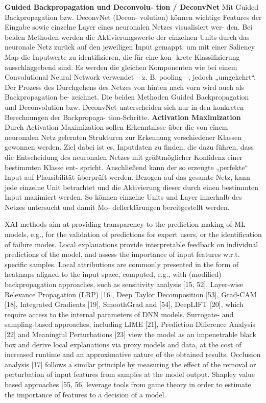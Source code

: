 \documentclass[11pt,a4paper]{article}
\numberwithin{equation}{section}
\begin{document}
	
	\noindent \textbf{Guided Backpropagation und Deconvolu-
		tion / DeconvNet}
	Mit Guided Backpropagation bzw. DeconvNet (Decon-
	volution) können wichtige Features der Eingabe sowie
	einzelne Layer eines neuronalen Netzes visualisiert wer-
	den. Bei beiden Methoden werden die Aktivierungswerte
	der einzelnen Units durch das neuronale Netz zurück
	auf den jeweiligen Input gemappt, um mit einer Saliency
	Map die Inputwerte zu identifizieren, die für eine kon-
	krete Klassifizierung ausschlaggebend sind. Es werden
	die gleichen Komponenten wie bei einem Convolutional
	Neural Network verwendet – z. B. pooling –, jedoch
	„umgekehrt“. Der Prozess des Durchgehens des Netzes
	von hinten nach vorn wird auch als Backpropagation be-
	zeichnet. Die beiden Methoden Guided Backpropagation
	und Deconvolution bzw. DeconvNet unterscheiden sich
	nur in den konkreten Berechnungen der Backpropaga-
	tion-Schritte.
	\noindent \textbf{Activation Maximization}
	Durch Activation Maximization sollen Erkenntnisse über
	die von einem neuronalen Netz gelernten Strukturen zur
	Erkennung verschiedener Klassen gewonnen werden.
	Ziel dabei ist es, Inputdaten zu finden, die dazu führen,
	dass die Entscheidung des neuronalen Netzes mit
	größtmöglicher Konfidenz einer bestimmten Klasse ent-
	spricht. Anschließend kann der so erzeugte „perfekte“
	Input auf Plausibilität überprüft werden. Bezogen auf
	das gesamte Netz, kann jede einzelne Unit betrachtet
	und die Aktivierung dieser durch einen bestimmten
	Input maximiert werden. So können einzelne Units und
	Layer innerhalb des Netzes untersucht und damit Mo-
	dellerklärungen bereitgestellt werden.
	
	
	XAI methods aim at providing transparency to the prediction making of ML models, e.g., for
	the validation of predictions for expert users, or the identification of failure modes. Local explanations provide
	interpretable feedback on individual predictions of the model, and assess the importance of input features
	w.r.t. specific samples. Local attributions are commonly presented in the form of heatmaps aligned to the
	input space, computed, e.g., with (modified) backpropagation approaches, such as sensitivity analysis [15, 52],
	Layer-wise Relevance Propagation (LRP) [16], Deep Taylor Decomposition [53], Grad-CAM [18], Integrated
	Gradients [19], SmoothGrad and [54], DeepLIFT [20], which require access to the internal parameters of DNN
	models. Surrogate- and sampling-based approaches, including LIME [21], Prediction Difference Analysis [22]
	and Meaningful Perturbations [23] view the model as an impenetrable black box and derive local explanations
	via proxy models and data, at the cost of increased runtime and an approximative nature of the obtained results.
	Occlusion analysis [17] follows a similar principle by measuring the effect of the removal or perturbation of input
	features from samples at the model output. Shapley value based approaches [55, 56] leverage tools from game
	theory in order to estimate the importance of features to a decision of a model.
	
\end{document}
